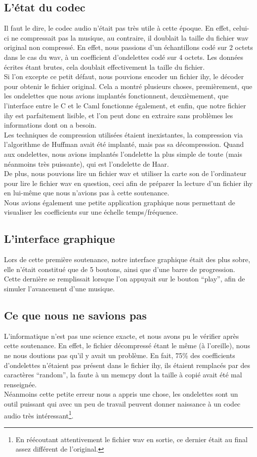 \documentclass[a4paper,12pt]{report}
\begin{document}
\subsection{L'état du codec}
Il faut le dire, le codec audio n'était pas très utile à cette époque. En effet,
celui-ci ne compressait pas la musique, au contraire, il doublait la taille du
fichier wav original non compressé. En effet, nous passions d'un échantillons
codé sur 2 octets dans le cas du wav, à un coefficient d'ondelettes codé sur 4
octets. Les données écrites étant brutes, cela doublait effectivement la taille
du fichier.\\
Si l'on excepte ce petit défaut, nous pouvions encoder un fichier ihy, le
décoder pour obtenir le fichier original. Cela a montré plusieurs choses,
premièrement, que les ondelettes que nous avions implantés fonctionnent,
deuxièmement, que l'interface entre le C et le Caml fonctionne également, et
enfin, que notre fichier ihy est parfaitement lisible, et l'on peut donc en
extraire sans problèmes les informations dont on a besoin.\\
Les techniques de compression utilisées étaient inexistantes, la compression via
l'algorithme de Huffman avait été implanté, mais pas sa décompression. Quand aux
ondelettes, nous avions implantés l'ondelette la plus simple de toute (mais
néanmoins très puissante), qui est l'ondelette de Haar.\\
De plus, nous pouvions lire un fichier wav et utiliser la carte son de
l'ordinateur pour lire le fichier wav en question, ceci afin de préparer la
lecture d'un fichier ihy en lui-même que nous n'avions pas à cette soutenance.\\
Nous avions également une petite application graphique nous permettant de
visualiser les coefficients sur une échelle temps/fréquence.
\subsection{L'interface graphique}
Lors de cette première soutenance, notre interface graphique était des plus
sobre, elle n'était constitué que de 5 boutons, ainsi que d'une barre de
progression. Cette dernière se remplissait lorsque l'on appuyait sur le bouton
``play'', afin de simuler l'avancement d'une musique.
\subsection{Ce que nous ne savions pas}
L'informatique n'est pas une science exacte, et nous avons pu le vérifier après
cette soutenance. En effet, le fichier décompressé étant le même (à l'oreille),
nous ne nous doutions pas qu'il y avait un problème. En fait, 75\% des
coefficients d'ondelettes n'étaient pas présent dans le fichier ihy, ils étaient
remplacés par des caractères ``random'', la faute à un memcpy dont la taille à
copié avait été mal renseignée.\\
Néanmoins cette petite erreur nous a appris une chose, les ondelettes sont un
outil puissant qui avec un peu de travail peuvent donner naissance à un codec
audio très intéressant\footnote{En réécoutant attentivement le fichier wav en
sortie, ce dernier était au final assez différent de l'original.}.
\end{document}
